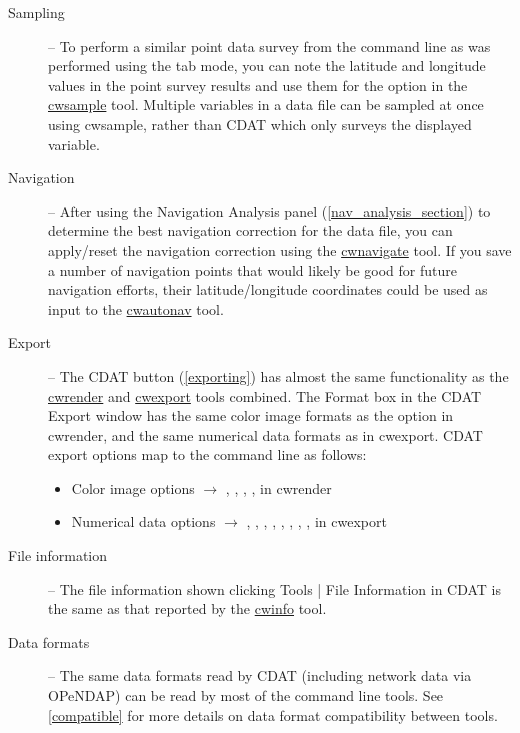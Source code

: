 \begin{description}
\item[Sampling] -- To perform a similar point data survey from
the command line as was performed using the
 tab 
mode, you can note the latitude and longitude values in the point
survey results and use them for the  option in
the \hyperlink{cwsample}{cwsample} tool.  Multiple variables in a
data file can be sampled at once using cwsample, rather than CDAT
which only surveys the displayed variable.

\item[Navigation] -- After using the {\gui Navigation Analysis} panel
(\autoref{nav_analysis_section}) to determine the best navigation
correction for the data file, you can apply/reset the navigation
correction using the \hyperlink{cwnavigate}{cwnavigate} tool.
If you save a number of navigation points that would likely be
good for future navigation efforts, their latitude/longitude
coordinates could be used as input to the
\hyperlink{cwautonav}{cwautonav} tool.

\item[Export] -- The CDAT  button
(\autoref{exporting}) has almost the same functionality as the
\hyperlink{cwrender}{cwrender} and \hyperlink{cwexport}{cwexport}
tools combined.  The {\gui Format} box in the CDAT {\gui Export}
window has the same color image formats as the
 option in cwrender, and the same numerical
data formats as  in cwexport.  CDAT export
options map to the command line as follows:
\begin{itemize}

\item Color image options $\rightarrow$ ,
, ,
,  in cwrender

\item Numerical data options $\rightarrow$ ,
, , ,
, , ,
,  in cwexport

\end{itemize}

\item[File information] -- The file information shown clicking
{\gui Tools | File Information} in CDAT is the same as that
reported by the \hyperlink{cwinfo}{cwinfo} tool.

\item[Data formats] -- The same data formats read by CDAT
(including network data via OPeNDAP) can be read by most of the
command line tools.  See \autoref{compatible} for more details on
data format compatibility between tools.

\end{description}
